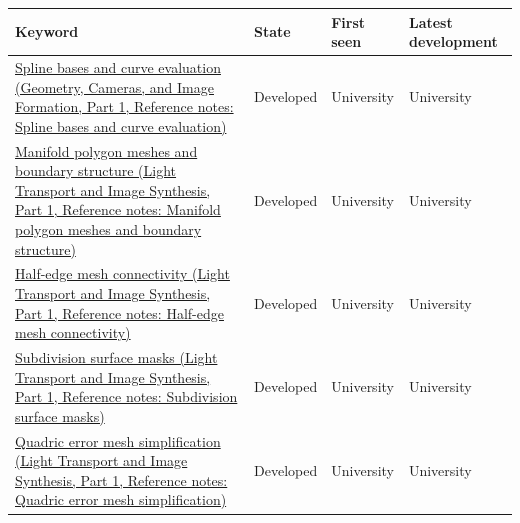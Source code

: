 {\def\LTcaptype{none} %
\begin{longtable}[]{@{}
  >{\raggedright\arraybackslash}p{}
  >{\raggedright\arraybackslash}p{}
  >{\raggedright\arraybackslash}p{}
  >{\raggedright\arraybackslash}p{}@{}}
\toprule\noalign{}
\begin{minipage}[b]{\linewidth}\raggedright
Keyword
\end{minipage} & \begin{minipage}[b]{\linewidth}\raggedright
State
\end{minipage} & \begin{minipage}[b]{\linewidth}\raggedright
First seen
\end{minipage} & \begin{minipage}[b]{\linewidth}\raggedright
Latest development
\end{minipage} \\
\midrule\noalign{}
\endhead
\bottomrule\noalign{}
\endlastfoot
\href{../03-Geometry-Cameras-and-Image-Formation-P01/main.pdf\#appendix-f28eeec97a3d}{Spline bases and curve evaluation (Geometry, Cameras, and Image Formation, Part 1, Reference notes: Spline bases and curve evaluation)} & Developed & University & University \\
\href{../04-Light-Transport-and-Image-Synthesis-P01/main.pdf\#appendix-fab348609369}{Manifold polygon meshes and boundary structure (Light Transport and Image Synthesis, Part 1, Reference notes: Manifold polygon meshes and boundary structure)} & Developed & University & University \\
\href{../04-Light-Transport-and-Image-Synthesis-P01/main.pdf\#appendix-1aea26b2307f}{Half-edge mesh connectivity (Light Transport and Image Synthesis, Part 1, Reference notes: Half-edge mesh connectivity)} & Developed & University & University \\
\href{../04-Light-Transport-and-Image-Synthesis-P01/main.pdf\#appendix-0234ab7f86b1}{Subdivision surface masks (Light Transport and Image Synthesis, Part 1, Reference notes: Subdivision surface masks)} & Developed & University & University \\
\href{../04-Light-Transport-and-Image-Synthesis-P01/main.pdf\#appendix-1dd4ad54ca57}{Quadric error mesh simplification (Light Transport and Image Synthesis, Part 1, Reference notes: Quadric error mesh simplification)} & Developed & University & University \\

\end{longtable}}

